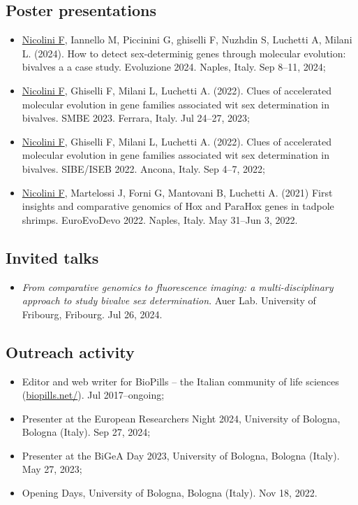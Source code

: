 \subsection*{Poster presentations}
\begin{itemize}
    \item \underline{Nicolini F}, Iannello M, Piccinini G, ghiselli F, Nuzhdin S, Luchetti A, Milani L. (2024). How to detect sex-determinig genes through molecular evolution: bivalves a a case study. Evoluzione 2024. Naples, Italy. Sep 8--11, 2024;
    \item \underline{Nicolini F}, Ghiselli F, Milani L, Luchetti A. (2022). Clues of accelerated molecular evolution in gene families associated wit sex determination in bivalves. SMBE 2023. Ferrara, Italy. Jul 24--27, 2023;
    \item \underline{Nicolini F}, Ghiselli F, Milani L, Luchetti A. (2022). Clues of accelerated molecular evolution in gene families associated wit sex determination in bivalves. SIBE/ISEB 2022. Ancona, Italy. Sep 4--7, 2022;
    \item \underline{Nicolini F}, Martelossi J, Forni G, Mantovani B, Luchetti A. (2021) First insights and comparative genomics of Hox and ParaHox genes in tadpole shrimps. EuroEvoDevo 2022. Naples, Italy. May 31--Jun 3, 2022.
\end{itemize}

\subsection*{Invited talks}
\begin{itemize}
    \item \textit{From comparative genomics to fluorescence imaging: a multi-disciplinary approach to study bivalve sex determination}. Auer Lab. University of Fribourg, Fribourg. Jul 26, 2024.
\end{itemize}

\subsection*{Outreach activity}
\begin{itemize}
    \item Editor and web writer for BioPills -- the Italian community of life sciences (\href{https://biopills.net/}{biopills.net/}). Jul 2017--ongoing;
    \item Presenter at the European Researchers\curlyapostrophe{} Night 2024, University of Bologna, Bologna (Italy). Sep 27, 2024;
    \item Presenter at the BiGeA Day 2023, University of Bologna, Bologna (Italy). May 27, 2023;
    \item Opening Days, University of Bologna, Bologna (Italy). Nov 18, 2022.
\end{itemize}


